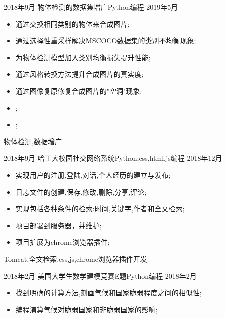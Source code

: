 %
%


 
\begin{experiences}
  
  \experience
  {2018年9月}   {物体检测的数据集增广}{Python编程}{}
  {2019年5月} {
  	\begin{itemize}
  		\item 通过交换相同类别的物体来合成图片;
  		\item 通过选择性重采样解决MSCOCO数据集的类别不均衡现象;
  		\item 为物体检测模型加入类别均衡损失提升性能;
  		\item 通过风格转换方法提升合成图片的真实度;
  		\item 通过图像复原修复合成图片的"空洞"现象;
  		\item {};
  		\item {};
  	\end{itemize}
  }
  {物体检测,数据增广}
  \emptySeparator
  
  \experience
  {2018年9月}   {哈工大校园社交网络系统}{Python,css,html,js编程}{}
  {2018年12月} {
      \begin{itemize}
      \item 实现用户的注册,登陆,对话,个人经历的建立与发布;
      \item 日志文件的创建,保存,修改,删除,分享,评论;
      \item 实现包括各种条件的检索:时间,关键字,作者和全文检索;
      \item 项目部署到服务器，并维护;
      \item 项目扩展为chrome浏览器插件;
                                                                                       
      \end{itemize}
  }
  {Tomcat,全文检索,css,js,chrome浏览器插件开发}
  \emptySeparator

 

  \experience
  {2018年2月}   {美国大学生数学建模竞赛E题}{Python编程}{}
  {2018年2月} {
  	\begin{itemize}
  		\item 找到明确的计算方法,刻画气候和国家脆弱程度之间的相似性;
  		\item 编程演算气候对脆弱国家和非脆弱国家的影响;
                                                                                     

\end{itemize}}
\end{experiences}
